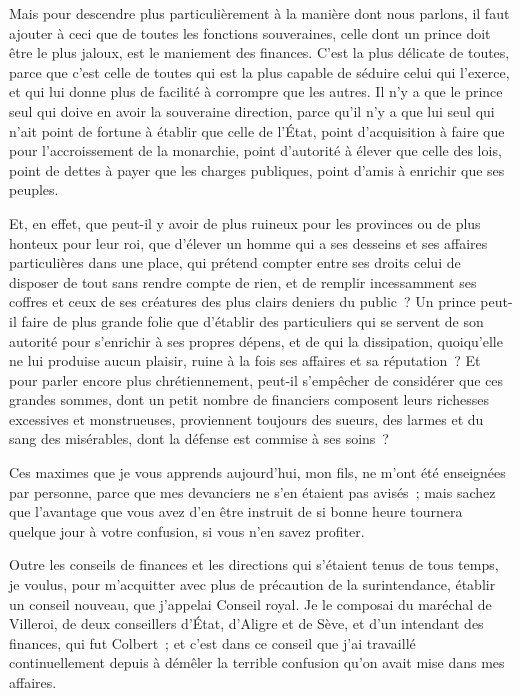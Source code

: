 \documentclass[french,twoside]{book} %
\begin{document}
Mais pour descendre plus particulièrement à la manière dont nous parlons, il faut ajouter à ceci que de toutes les fonctions souveraines, celle dont un prince doit être le plus jaloux, est le maniement des finances. C’est la plus délicate de toutes, parce que c’est celle de toutes qui est la plus capable de séduire celui qui l’exerce, et qui lui donne plus de facilité à corrompre que les autres. Il n’y a que le prince seul qui doive en avoir la souveraine direction, parce qu’il n’y a que lui seul qui n’ait point de fortune à établir que celle de l’État, point d’acquisition à faire que pour l’accroissement de la monarchie, point d’autorité à élever que celle des lois, point de dettes à payer que les charges publiques, point d’amis à enrichir que ses peuples.\par
Et, en effet, que peut-il y avoir de plus ruineux pour les provinces ou de plus honteux pour leur roi, que d’élever un homme qui a ses desseins et ses affaires particulières dans une place, qui prétend compter entre ses droits celui de disposer de tout sans rendre compte de rien, et de remplir incessamment ses coffres et ceux de ses créatures des plus clairs deniers du public ? Un prince peut-il faire de plus grande folie que d’établir des particuliers qui se servent de son autorité pour s’enrichir à ses propres dépens, et de qui la dissipation, quoiqu’elle ne lui produise aucun plaisir, ruine à la fois ses affaires et sa réputation ? Et pour parler encore plus chrétiennement, peut-il s’empêcher de considérer que ces grandes sommes, dont un petit nombre de financiers composent leurs richesses excessives et monstrueuses, proviennent toujours des sueurs, des larmes et du sang des misérables, dont la défense est commise à ses soins ?\par
Ces maximes que je vous apprends aujourd’hui, mon fils, ne m’ont été enseignées par personne, parce que mes devanciers ne s’en étaient pas avisés ; mais sachez que l’avantage que vous avez d’en être instruit de si bonne heure tournera quelque jour à votre confusion, si vous n’en savez profiter.\par
Outre les conseils de finances et les directions qui s’étaient tenus de tous temps, je voulus, pour m’acquitter avec plus de précaution de la surintendance, établir un conseil nouveau, que j’appelai Conseil royal. Je le composai du maréchal de Villeroi, de deux conseillers d’État, d’Aligre et de Sève, et d’un intendant des finances, qui fut Colbert ; et c’est dans ce conseil que j’ai travaillé continuellement depuis à démêler la terrible confusion qu’on avait mise dans mes affaires.\par
\end{document}
